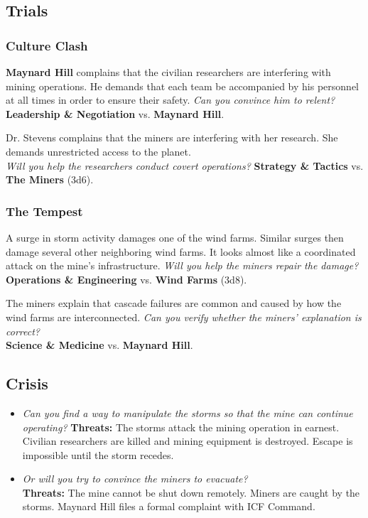 \documentclass[11pt, a5paper, parskip=half-, DIV=12]{scrartcl}
\begin{document}
\newpage

\subsection*{Trials}
\subsubsection*{Culture Clash}
\textbf{Maynard Hill} complains that the civilian researchers are interfering with mining operations. He demands that each team be accompanied by his personnel at all times in order to ensure their safety. \textit{Can you convince him to relent?} \\ \textbf{Leadership \& Negotiation} vs. \textbf{Maynard Hill}.

Dr. Stevens complains that the miners are interfering with her research. She demands unrestricted access to the planet. \\ \textit{Will you help the researchers conduct covert operations?} \textbf{Strategy \& Tactics} vs. \textbf{The Miners} (3d6).

\subsubsection*{The Tempest}
A surge in storm activity damages one of the wind farms. Similar surges then damage several other neighboring wind farms. It looks almost like a coordinated attack on the mine's infrastructure. \textit{Will you help the miners repair the damage?} \textbf{Operations \& Engineering} vs. \textbf{Wind Farms} (3d8).

The miners explain that cascade failures are common and caused by how the wind farms are interconnected. \textit{Can you verify whether the miners' explanation is correct?}
\\ \textbf{Science \& Medicine} vs. \textbf{Maynard Hill}.


\subsection*{Crisis}
\begin{itemize}
	\item \textit{Can you find a way to manipulate the storms so that the mine can continue operating?} \textbf{Threats:} The storms attack the mining operation in earnest. Civilian researchers are killed and mining equipment is destroyed. Escape is impossible until the storm recedes.
	\item \textit{Or will you try to convince the miners to evacuate?} \\ \textbf{Threats:} The mine cannot be shut down remotely. Miners are caught by the storms. Maynard Hill files a formal complaint with ICF Command.
\end{itemize}
\end{document}
